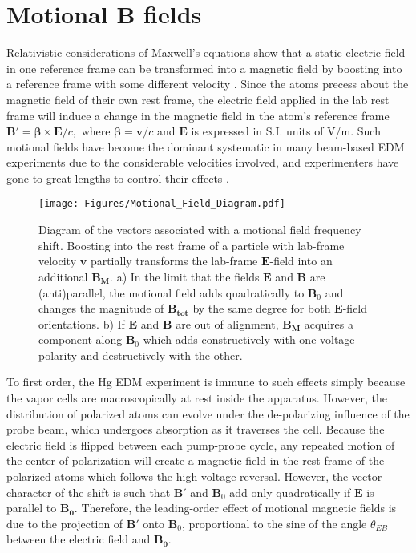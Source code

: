 \documentclass [10pt, twoside] {uwthesis}[2012/04/02]
\begin{document}
\section{Motional B fields}
Relativistic considerations of Maxwell's equations show that a static electric field in one reference frame can be transformed into a magnetic field by boosting into a reference frame with some different velocity \cite[11.150]{Jackson}. Since the atoms precess about the magnetic field of their own rest frame, the electric field applied in the lab rest frame will induce a change in the magnetic field in the atom's reference frame $\mathbf{B}' = \mathbf{\beta} \times \mathbf{E}/c,$ where $\mathbf{\beta} = \mathbf{v}/c$ and $\mathbf{E}$ is expressed in S.I. units of V/m. Such motional fields have become the dominant systematic in many beam-based EDM experiments due to the considerable velocities involved, and experimenters have gone to great lengths to control their effects \cite{2002_Tl_EDM}. 

\begin{figure}
\begin{center}
\texttt{[image: Figures/Motional\_Field\_Diagram.pdf]}
\end{center}
\caption[Diagram of motional field frequency shift]%
{\narrower Diagram of the vectors associated with a motional field frequency shift. Boosting into the rest frame of a particle with lab-frame velocity $\mathbf{v}$ partially transforms the lab-frame $\mathbf{E}$-field into an additional $\mathbf{B_M}$. a) In the limit that the fields $\mathbf{E}$ and $\mathbf{B}$ are (anti)parallel, the motional field adds quadratically to $\mathbf{B}_0$ and changes the magnitude of $\mathbf{B_{tot}}$ by the same degree for both $\mathbf{E}$-field orientations. b) If $\mathbf{E}$ and $\mathbf{B}$ are out of alignment, $\mathbf{B_M}$ acquires a component along $\mathbf{B}_0$ which adds constructively with one voltage polarity and destructively with the other.}
\label{MotionalFieldDiagram}
\end{figure}

To first order, the Hg EDM experiment is immune to such effects simply because the vapor cells are macroscopically at rest inside the apparatus. However, the distribution of polarized atoms can evolve under the de-polarizing influence of the probe beam, which undergoes absorption as it traverses the cell. Because the electric field is flipped between each pump-probe cycle, any repeated motion of the center of polarization will create a magnetic field in the rest frame of the polarized atoms which follows the high-voltage reversal. However, the vector character of the shift is such that $\mathbf{B}'$ and $\mathbf{B}_0$ add only quadratically if $\mathbf{E}$ is parallel to $\mathbf{B_0}.$ Therefore, the leading-order effect of motional magnetic fields is due to the projection of $\mathbf{B}'$ onto $\mathbf{B}_0$, proportional to the sine of the angle $\theta_{EB}$ between the electric field and $\mathbf{B_0}.$
\end{document}
